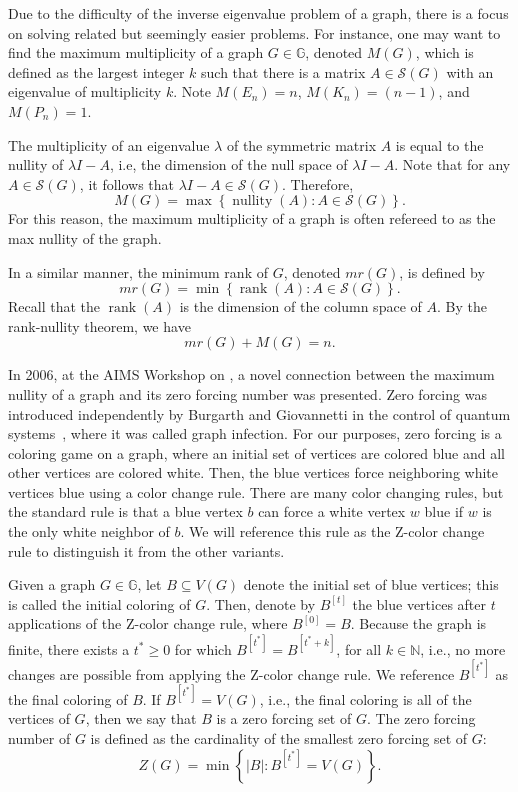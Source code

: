 \documentclass{article}
\theoremstyle{definition}
\newcommand\abs[1]{\left|#1\right|}
\newcommand\nullity[1]{\operatorname{nullity}\left(#1\right)}
\newcommand\rank[1]{\operatorname{rank}\left(#1\right)}
\begin{document}
Due to the difficulty of the inverse eigenvalue problem of a graph, there is a focus on solving related but seemingly easier problems.
For instance, one may want to find the maximum multiplicity of a graph $G\in\mathbb{G}$, denoted $M(G)$, which is defined as the largest integer $k$ such that there is a matrix $A\in\mathcal{S}(G)$ with an eigenvalue of multiplicity $k$.
Note $M(E_{n})=n$, $M(K_{n})=(n-1)$,  and $M(P_{n})=1$.

The multiplicity of an eigenvalue $\lambda$ of the symmetric matrix $A$ is equal to the nullity of $\lambda I - A$, i.e,  the dimension of the null space of $\lambda I-A$.
Note that for any $A\in\mathcal{S}(G)$, it follows that $\lambda I - A\in\mathcal{S}(G)$.
Therefore,
\[
M(G) = \max\left\{\nullity{A}\colon A\in\mathcal{S}(G)\right\}.
\]
For this reason, the maximum multiplicity of a graph is often refereed to as the max nullity of the graph. 

In a similar manner, the minimum rank of $G$, denoted $mr(G)$, is defined by 
\[
mr(G) = \min\left\{\rank{A}\colon A\in\mathcal{S}(G)\right\}.
\]
Recall that the $\rank{A}$ is the dimension of the column space of $A$.
By the rank-nullity theorem, we have
\[
mr(G) + M(G) = n.
\]

In 2006, at the AIMS Workshop on , a novel connection between the maximum nullity of a graph and its zero forcing number was presented. 
Zero forcing was introduced independently by Burgarth and Giovannetti in the control of quantum systems~\cite{Burgarth2007}, where it was called graph infection.
For our purposes, zero forcing is a coloring game on a graph, where an initial set of vertices are colored blue and all other vertices are colored white.
Then, the blue vertices force neighboring white vertices blue using a color change rule.
There are many color changing rules, but the standard rule is that a blue vertex $b$ can force a white vertex $w$ blue if $w$ is the only white neighbor of $b$.
We will reference this rule as the Z-color change rule to distinguish it from the other variants. 

Given a  graph $G\in\mathbb{G}$, let $B\subseteq V(G)$ denote the initial set of blue vertices; this is called the initial coloring of $G$.
Then, denote by $B^{[t]}$ the blue vertices after $t$ applications of the Z-color change rule, where $B^{[0]}=B$.
Because the graph is finite, there exists a $t^{*}\geq 0$ for which $B^{[t^{*}]} = B^{[t^{*}+k]}$, for all $k\in\mathbb{N}$, i.e., no more changes are possible from applying the Z-color change rule. 
We reference $B^{[t^{*}]}$ as the final coloring of $B$.
If $B^{[t^{*}]} = V(G)$, i.e., the final coloring is all of the vertices of $G$, then we say that $B$ is a zero forcing set of $G$.
The zero forcing number of $G$ is defined as the cardinality of the smallest zero forcing set of $G$:
\[
Z(G) = \min\left\{\abs{B}\colon B^{[t^{*}]} = V(G)\right\}.
\]
\end{document}
